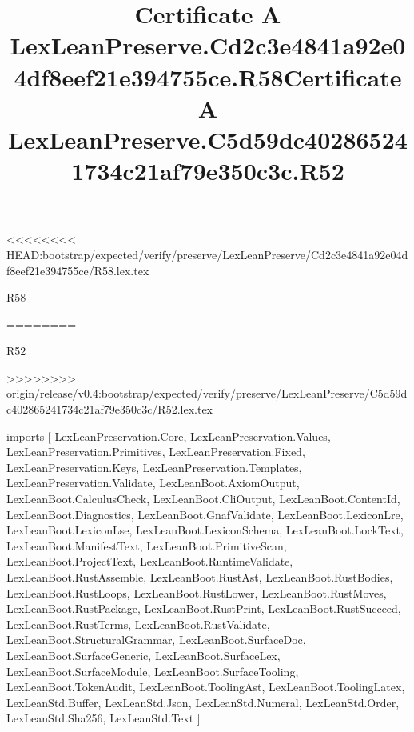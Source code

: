 <<<<<<<< HEAD:bootstrap/expected/verify/preserve/LexLeanPreserve/Cd2c3e4841a92e04df8eef21e394755ce/R58.lex.tex
\begin{lexlean}{R58}
\title{Certificate A LexLeanPreserve.Cd2c3e4841a92e04df8eef21e394755ce.R58}
========
\begin{lexlean}{R52}
\title{Certificate A LexLeanPreserve.C5d59dc402865241734c21af79e350c3c.R52}
>>>>>>>> origin/release/v0.4:bootstrap/expected/verify/preserve/LexLeanPreserve/C5d59dc402865241734c21af79e350c3c/R52.lex.tex
\begin{coremodule}
imports [
  LexLeanPreservation.Core,
  LexLeanPreservation.Values,
  LexLeanPreservation.Primitives,
  LexLeanPreservation.Fixed,
  LexLeanPreservation.Keys,
  LexLeanPreservation.Templates,
  LexLeanPreservation.Validate,
  LexLeanBoot.AxiomOutput,
  LexLeanBoot.CalculusCheck,
  LexLeanBoot.CliOutput,
  LexLeanBoot.ContentId,
  LexLeanBoot.Diagnostics,
  LexLeanBoot.GnafValidate,
  LexLeanBoot.LexiconLre,
  LexLeanBoot.LexiconLse,
  LexLeanBoot.LexiconSchema,
  LexLeanBoot.LockText,
  LexLeanBoot.ManifestText,
  LexLeanBoot.PrimitiveScan,
  LexLeanBoot.ProjectText,
  LexLeanBoot.RuntimeValidate,
  LexLeanBoot.RustAssemble,
  LexLeanBoot.RustAst,
  LexLeanBoot.RustBodies,
  LexLeanBoot.RustLoops,
  LexLeanBoot.RustLower,
  LexLeanBoot.RustMoves,
  LexLeanBoot.RustPackage,
  LexLeanBoot.RustPrint,
  LexLeanBoot.RustSucceed,
  LexLeanBoot.RustTerms,
  LexLeanBoot.RustValidate,
  LexLeanBoot.StructuralGrammar,
  LexLeanBoot.SurfaceDoc,
  LexLeanBoot.SurfaceGeneric,
  LexLeanBoot.SurfaceLex,
  LexLeanBoot.SurfaceModule,
  LexLeanBoot.SurfaceTooling,
  LexLeanBoot.TokenAudit,
  LexLeanBoot.ToolingAst,
  LexLeanBoot.ToolingLatex,
  LexLeanStd.Buffer,
  LexLeanStd.Json,
  LexLeanStd.Numeral,
  LexLeanStd.Order,
  LexLeanStd.Sha256,
  LexLeanStd.Text
]


\end{coremodule}
\end{lexlean}
\end{lexlean}
